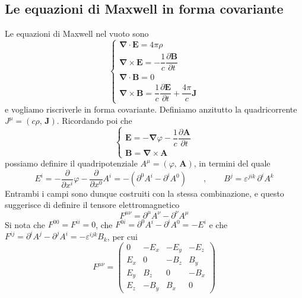 \subsection*{Le equazioni di Maxwell in forma covariante}

Le equazioni di Maxwell nel vuoto sono
%
\begin{equation}
\left\{\begin{array}{l}
\boldsymbol{\nabla}\cdot\mathbf{E} = 4\pi\rho \\[2pt]
\boldsymbol{\nabla}\times\mathbf{E} = -\dfrac{1}{c}\dfrac{\partial \mathbf{B}}{\partial t} \\[6pt]
\boldsymbol{\nabla}\cdot\mathbf{B} = 0 \\[2pt]
\boldsymbol{\nabla}\times\mathbf{B} = \dfrac{1}{c}\dfrac{\partial \mathbf{E}}{\partial t} + \dfrac{4\pi}{c}\mathbf{J}
\end{array}\right.
\label{eq:maxwell}
\end{equation}
e vogliamo riscriverle in forma covariante. Definiamo anzitutto la quadricorrente $J^\mu = (c\rho,\,\mathbf{J})$. Ricordando poi che
%
\begin{equation*}
\left\{\begin{array}{l}
\mathbf{E} = -\boldsymbol{\nabla}\varphi - \dfrac{1}{c}\dfrac{\partial\mathbf{A}}{\partial t} \\[6pt]
\mathbf{B} = \boldsymbol{\nabla}\times\mathbf{A}
\end{array}\right.
\end{equation*}
possiamo definire il quadripotenziale $A^\mu = (\varphi,\,\mathbf{A})$, in termini del quale
%
\begin{equation*}
    E^i = -\frac{\partial}{\partial x^i}\varphi - \frac{\partial}{\partial x^0}A^i = -\left(\partial^0 A^i - \partial^i A^0\right) \qquad , \qquad B^j = \varepsilon^{jik}\,\partial^i A^k
\end{equation*}
Entrambi i campi sono dunque costruiti con la stessa combinazione, e questo suggerisce di definire il tensore elettromagnetico
%
\begin{equation}
    F^{\mu\nu} = \partial^\mu A^\nu - \partial^\nu A^\mu
    \label{eq:tensore_em}
\end{equation}
Si nota che $F^{00} = F^{ii} = 0$, che $F^{0i} = \partial^0A^i - \partial^iA^0 = -E^i$ e che $F^{ij} = \partial^iA^j - \partial^jA^i = -\varepsilon^{ijk}B_k$, per cui
%
\begin{equation}
    F^{\mu\nu} = \begin{pmatrix}
    0 & -E_x & -E_y & -E_z \\
    E_x & 0 & -B_z & B_y \\
    E_y & B_z & 0 & -B_x \\
    E_z & -B_y & B_x & 0
    \end{pmatrix}
    \label{eq:matrice_F}
\end{equation}
